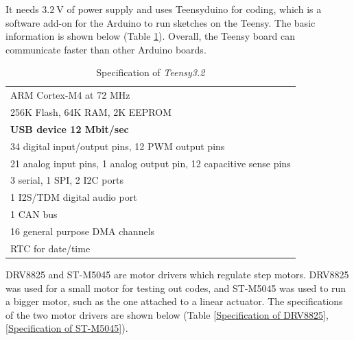 It needs $3.2\mathrm{~V}$ of power supply and uses Teensyduino for coding, which is a software add-on for the Arduino to run sketches on the Teensy. The basic information is shown below (Table \ref{Specification of Teensy 3.2}). Overall, the Teensy board can communicate faster than other Arduino boards.



 \begin{table}[H]
     \centering
     \begin{tabular}{l}
        \hline
        ARM Cortex-M4 at 72 MHz\\
        256K Flash, 64K RAM, 2K EEPROM\\
        \textbf{USB device 12 Mbit/sec}\\
        34 digital input/output pins, 12 PWM output pins\\
        21 analog input pins, 1 analog output pin, 12 capacitive sense pins\\
        3 serial, 1 SPI, 2 I2C ports\\
        1 I2S/TDM digital audio port\\
        1 CAN bus\\
        16 general purpose DMA channels\\
        RTC for date/time\\
        \hline
     \end{tabular}
     \caption{Specification of \textit{Teensy3.2}}
     \label{Specification of Teensy 3.2}
 \end{table}

DRV8825 and ST-M5045 are motor drivers which regulate step motors. DRV8825 was used for a small motor for testing out codes, and ST-M5045 was used to run a bigger motor, such as the one attached to a linear actuator. The specifications of the two motor drivers are shown below (Table \ref{Specification of DRV8825}, \ref{Specification of ST-M5045}).

